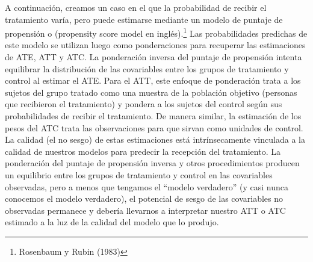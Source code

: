 \documentclass[
]{article}
\begin{document}
A continuación, creamos un caso en el que la probabilidad de recibir el
tratamiento varía, pero puede estimarse mediante un modelo de puntaje de
propensión o (propensity score model en inglés).\footnote{Rosenbaum y
  Rubin (1983)} Las probabilidades predichas de este modelo se utilizan
luego como ponderaciones para recuperar las estimaciones de ATE, ATT y
ATC. La ponderación inversa del puntaje de propensión intenta equilibrar
la distribución de las covariables entre los grupos de tratamiento y
control al estimar el ATE. Para el ATT, este enfoque de ponderación
trata a los sujetos del grupo tratado como una muestra de la población
objetivo (personas que recibieron el tratamiento) y pondera a los
sujetos del control según sus probabilidades de recibir el tratamiento.
De manera similar, la estimación de los pesos del ATC trata las
observaciones para que sirvan como unidades de control. La calidad (el
no sesgo) de estas estimaciones está intrínsecamente vinculada a la
calidad de nuestros modelos para predecir la recepción del tratamiento.
La ponderación del puntaje de propensión inversa y otros procedimientos
producen un equilibrio entre los grupos de tratamiento y control en las
covariables observadas, pero a menos que tengamos el ``modelo
verdadero'' (y casi nunca conocemos el modelo verdadero), el potencial
de sesgo de las covariables no observadas permanece y debería llevarnos
a interpretar nuestro ATT o ATC estimado a la luz de la calidad del
modelo que lo produjo.
\end{document}
